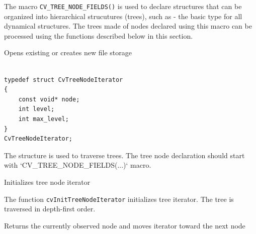 The macro \texttt{CV\_TREE\_NODE\_FIELDS()} is used to declare structures
that can be organized into hierarchical strucutures (trees), such as
 - the basic type for all dynamical structures. The trees
made of nodes declared using this macro can be processed using the
functions described below in this section.

\label{CvTreeNodeIterator}

Opens existing or creates new file storage

\begin{lstlisting}

typedef struct CvTreeNodeIterator
{
    const void* node;
    int level;
    int max_level;
}
CvTreeNodeIterator;

\end{lstlisting}

The structure  is used to traverse trees. The tree node declaration should start with `CV\_TREE\_NODE\_FIELDS(...)` macro.

\label{InitTreeNodeIterator}

Initializes tree node iterator


\begin{description}
\end{description}

The function \texttt{cvInitTreeNodeIterator} initializes tree iterator. The tree is traversed in depth-first order.

\label{NextTreeNode}

Returns the currently observed node and moves iterator toward the next node

